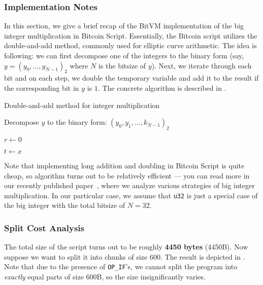 \documentclass{iacrtrans}
\begin{document}
\subsubsection{Implementation Notes}

In this section, we give a brief recap of the BitVM implementation of the big
integer multiplication in Bitcoin Script. Essentially, the Bitcoin script
utilizes the double-and-add method, commonly used for elliptic curve arithmetic.
The idea is following: we can first decompose one of the integers to the binary
form (say, $y={(y_0,\dots,y_{N-1})}_2$ where $N$ is the bitsize of
$y$). Next, we
iterate through each bit and on each step, we double the temporary variable and
add it to the result if the corresponding bit in $y$ is $1$. The concrete
algorithm is described in .

\begin{algorithm}
  \caption{Double-and-add method for integer
  multiplication}\label{alg:double_and_add}

  Decompose $y$ to the binary form: ${(y_0,y_1,\dots,k_{N-1})}_2$

  $r \gets 0$

  $t \gets x$



\end{algorithm}

Note that implementing long addition and doubling in Bitcoin Script is quite
cheap, so algorithm turns out to be relatively efficient --- you can read more
in our recently published paper~\cite{w-width-mul}, where we analyze various
strategies of big integer multiplication. In our particular case, we assume that
\texttt{u32} is just a special case of the big integer with the total bitsize of
$N=32$.

\subsubsection{Split Cost Analysis}

The total size of the script turns out to be roughly \textbf{4450 bytes}
(4450B). Now suppose we want to split it into chunks of size $600$. The result
is depicted in . Note that due to the presence of
\texttt{OP\_IF}'s, we cannot split the program into \textit{exactly} equal parts
of size 600B, so the size insignificantly varies.
\end{document}
